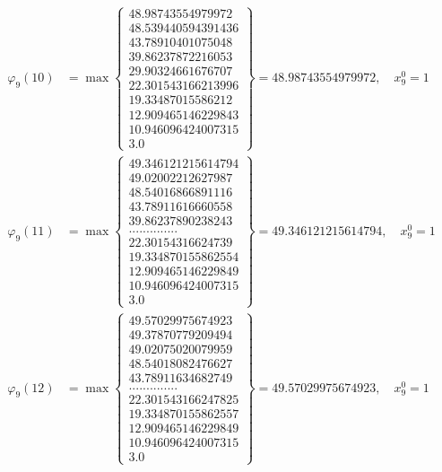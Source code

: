 \documentclass{article}
\begin{document}
\begin{align*}
  
  
  
\varphi_{9}(10) &= \max \left\{ \begin{array}{c}
48.98743554979972 \\
 48.539440594391436 \\
 43.78910401075048 \\
 39.86237872216053 \\
 29.90324661676707 \\
 22.301543166213996 \\
 19.33487015586212 \\
 12.909465146229843 \\
 10.946096424007315 \\
 3.0
\end{array} \right\} = 48.98743554979972, \quad x_{9}^0 = 1\\
  
  
  
  
\varphi_{9}(11) &= \max \left\{ \begin{array}{c}
49.346121215614794 \\
 49.02002212627987 \\
 48.54016866891116 \\
 43.78911616660558 \\
 39.86237890238243 \\
 .............. \\
 22.30154316624739 \\
 19.334870155862554 \\
 12.909465146229849 \\
 10.946096424007315 \\
 3.0
\end{array} \right\} = 49.346121215614794, \quad x_{9}^0 = 1\\
  
  
  
  
\varphi_{9}(12) &= \max \left\{ \begin{array}{c}
49.57029975674923 \\
 49.37870779209494 \\
 49.02075020079959 \\
 48.54018082476627 \\
 43.78911634682749 \\
 .............. \\
 22.301543166247825 \\
 19.334870155862557 \\
 12.909465146229849 \\
 10.946096424007315 \\
 3.0
\end{array} \right\} = 49.57029975674923, \quad x_{9}^0 = 1\\
  

\end{align*}
\end{document}
